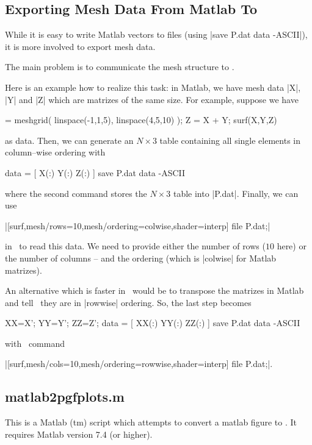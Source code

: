 \begin{pgfgraphicnamed}
\subsection{Exporting Mesh Data From Matlab To \PGFPlots}
While it is easy to write Matlab vectors to files (using |save P.dat data -ASCII|), it is more involved to export mesh data.

The main problem is to communicate the mesh structure to \PGFPlots.

Here is an example how to realize this task: in Matlab, we have mesh data |X|, |Y| and |Z| which are matrizes of the same size. For example, suppose we have

\begin{codeexample} = meshgrid( linspace(-1,1,5), linspace(4,5,10) );
Z = X + Y;
surf(X,Y,Z)
\end{codeexample}
\noindent as data. Then, we can generate an $N \times 3$ table containing all single elements in column--wise ordering with

\begin{codeexample}
data = [ X(:) Y(:) Z(:) ]
save P.dat data -ASCII
\end{codeexample}
\noindent where the second command stores the $N \times 3$ table into |P.dat|. Finally, we can use 

|[surf,mesh/rows=10,mesh/ordering=colwise,shader=interp] file {P.dat};|

in \PGFPlots\ to read this data. We need to provide either the number of rows ($10$ here) or the number of columns -- and the ordering (which is |colwise| for Matlab matrizes).

An alternative which is faster in \PGFPlots\ would be to transpose the matrizes in Matlab and tell \PGFPlots\ they are in |rowwise| ordering. So, the last step becomes

\begin{codeexample}
XX=X'; YY=Y'; ZZ=Z';
data = [ XX(:) YY(:) ZZ(:) ]
save P.dat data -ASCII
\end{codeexample}
\noindent with \PGFPlots\ command

|[surf,mesh/cols=10,mesh/ordering=rowwise,shader=interp] file {P.dat};|.

\subsection{matlab2pgfplots.m}
This is a Matlab (tm) script which attempts to convert a matlab figure to \PGFPlots. It requires Matlab version 7.4 (or higher).


\end{pgfgraphicnamed}
